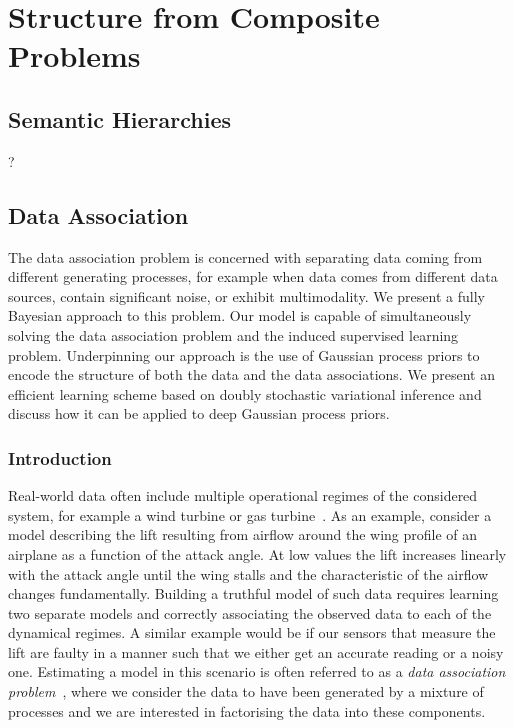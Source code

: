 \chapter{Structure from Composite Problems}
\label{cha:structure_from_composite_problems}


\section{Semantic Hierarchies}
\label{sec:semantic_hierarchies}
?


\section{Data Association}
\label{sec:data_association:data_association}
The data association problem is concerned with separating data coming from different generating processes, for example when data comes from different data sources, contain significant noise, or exhibit multimodality.
We present a fully Bayesian approach to this problem.
Our model is capable of simultaneously solving the data association problem and the induced supervised learning problem.
Underpinning our approach is the use of Gaussian process priors to encode the structure of both the data and the data associations.
We present an efficient learning scheme based on doubly stochastic variational inference and discuss how it can be applied to deep Gaussian process priors.


\subsection{Introduction}
\label{sub:data_association:introduction}
Real-world data often include multiple operational regimes of the considered system, for example a wind turbine or gas turbine~\parencite{hein_benchmark_2017}.
As an example, consider a model describing the lift resulting from airflow around the wing profile of an airplane as a function of the attack angle.
At low values the lift increases linearly with the attack angle until the wing stalls and the characteristic of the airflow changes fundamentally.
Building a truthful model of such data requires learning two separate models and correctly associating the observed data to each of the dynamical regimes.
A similar example would be if our sensors that measure the lift are faulty in a manner such that we either get an accurate reading or a noisy one.
Estimating a model in this scenario is often referred to as a \emph{data association problem}~\parencite{barshalom_tracking_1990, cox_review_1993}, where we consider the data to have been generated by a mixture of processes and we are interested in factorising the data into these components.

